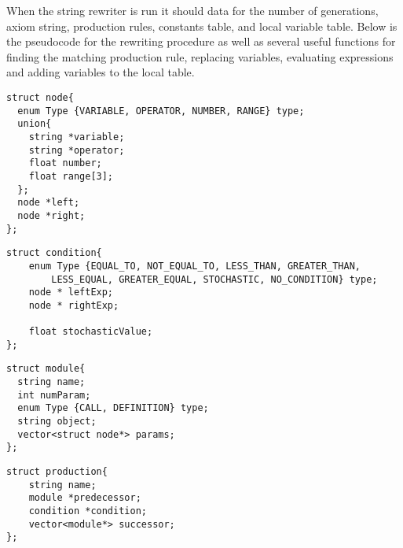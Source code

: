 When the string rewriter is run it should data for the number of generations, axiom string, production rules, constants table, and local variable table. Below is the pseudocode for the rewriting procedure as well as several useful functions for finding the matching production rule, replacing variables, evaluating expressions and adding variables to the local table. 

\begin{singlespace}
\newpage

\lstset{language=C}
\lstset{morekeywords=string}

\begin{lstlisting}[frame=single] 
struct node{
  enum Type {VARIABLE, OPERATOR, NUMBER, RANGE} type;
  union{
  	string *variable; 
  	string *operator; 
  	float number;
  	float range[3];
  };
  node *left; 
  node *right; 
};
\end{lstlisting}

\lstset{morekeywords=vector}
\lstset{morekeywords=node}

\begin{lstlisting}[frame=single] 
struct condition{
    enum Type {EQUAL_TO, NOT_EQUAL_TO, LESS_THAN, GREATER_THAN, 
    	LESS_EQUAL, GREATER_EQUAL, STOCHASTIC, NO_CONDITION} type;
    node * leftExp;
    node * rightExp;

    float stochasticValue;
};
\end{lstlisting}

\lstset{morekeywords=condition}

\begin{lstlisting}[frame=single] 
struct module{
  string name;
  int numParam; 
  enum Type {CALL, DEFINITION} type;
  string object; 
  vector<struct node*> params;
};
\end{lstlisting}

\lstset{morekeywords=module}

\begin{lstlisting}[frame=single] 
struct production{
    string name;
    module *predecessor;
    condition *condition;
    vector<module*> successor;
};
\end{lstlisting}


\end{singlespace}
